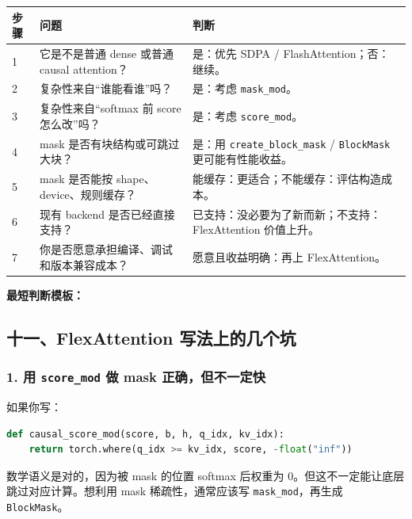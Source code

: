 \begin{center}
{\small
\begin{tabular}{p{1.0cm}p{6.4cm}p{5.4cm}}
\hline
\textbf{步骤} & \textbf{问题} & \textbf{判断} \\
\hline
1 & 它是不是普通 dense 或普通 causal attention？ & 是：优先 SDPA / FlashAttention；否：继续。 \\
2 & 复杂性来自“谁能看谁”吗？ & 是：考虑 \texttt{mask\_mod}。 \\
3 & 复杂性来自“softmax 前 score 怎么改”吗？ & 是：考虑 \texttt{score\_mod}。 \\
4 & mask 是否有块结构或可跳过大块？ & 是：用 \texttt{create\_block\_mask} / \texttt{BlockMask} 更可能有性能收益。 \\
5 & mask 是否能按 shape、device、规则缓存？ & 能缓存：更适合；不能缓存：评估构造成本。 \\
6 & 现有 backend 是否已经直接支持？ & 已支持：没必要为了新而新；不支持：FlexAttention 价值上升。 \\
7 & 你是否愿意承担编译、调试和版本兼容成本？ & 愿意且收益明确：再上 FlexAttention。 \\
\hline
\end{tabular}
}
\end{center}

\begin{summarybox}
\textbf{最短判断模板：} 
\end{summarybox}

\subsection{十一、FlexAttention 写法上的几个坑}

\subsubsection*{1. 用 \texttt{score\_mod} 做 mask 正确，但不一定快}

如果你写：

\begin{lstlisting}[language=Python]
def causal_score_mod(score, b, h, q_idx, kv_idx):
    return torch.where(q_idx >= kv_idx, score, -float("inf"))
\end{lstlisting}

数学语义是对的，因为被 mask 的位置 softmax 后权重为 0。但这不一定能让底层跳过对应计算。想利用 mask 稀疏性，通常应该写 \texttt{mask\_mod}，再生成 \texttt{BlockMask}。

